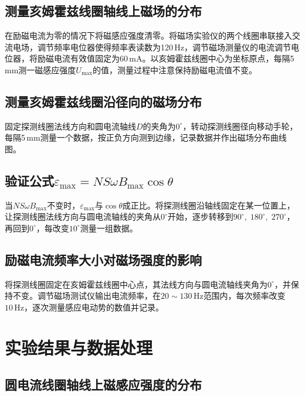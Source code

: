 \documentclass[12pt]{article}
\begin{document}
\subsection{测量亥姆霍兹线圈轴线上磁场的分布}
在励磁电流为零的情况下将磁感应强度清零。将磁场实验仪的两个线圈串联接入交流电场，调节频率电位器使得频率表读数为120\,Hz，调节磁场测量仪的电流调节电位器，将励磁电流有效值固定为60\,mA。以亥姆霍兹线圈中心为坐标原点，每隔5\,mm测一磁感应强度$ U_\max $的值，测量过程中注意保持励磁电流值不变。

\subsection{测量亥姆霍兹线圈沿径向的磁场分布}
固定探测线圈法线方向和圆电流轴线$ D $的夹角为$ 0^\circ $，转动探测线圈径向移动手轮，每隔5\,mm测量一个数据，按正负方向测到边缘，记录数据并作出磁场分布曲线图。

\subsection{验证公式$ \varepsilon_\max=NS\omega B_\max\cos\theta $}
当$ NS\omega B_\max $不变时，$ \varepsilon_\max $与$ \cos\theta $成正比。将探测线圈沿轴线固定在某一位置上，让探测线圈法线方向与圆电流轴线的夹角从$ 0^\circ $开始，逐步转移到$ 90^\circ,\;180^\circ,\;270^\circ $，再回到$ 0^\circ $，每改变$ 10^\circ $测量一组数据。

\subsection{励磁电流频率大小对磁场强度的影响}
将探测线圈固定在亥姆霍兹线圈中心点，其法线方向与圆电流轴线夹角为$ 0^\circ $，并保持不变。调节磁场测试仪输出电流频率，在$ 20\sim 130\,\mathrm{Hz} $范围内，每次频率改变$ 10\,\mathrm{Hz} $，逐次测量感应电动势的数值并记录。

\section{实验结果与数据处理}
\subsection{圆电流线圈轴线上磁感应强度的分布}
\end{document}
